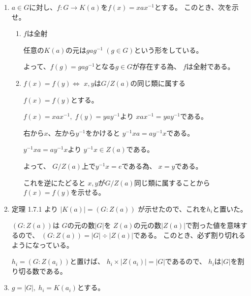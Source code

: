 \documentclass[12pt,b5paper]{ltjsarticle}
\begin{document}
\begin{enumerate}
\begin{enumerate}
      \end{enumerate}
 \item $a\in G$に対し、$f:G\to K(a)$を$f(x)=xax^{-1}$とする。
       このとき、次を示せ。
       \begin{enumerate}
        \item $f$は全射

              \dotfill

              任意の$K(a)$の元は$gag^{-1} \; (g\in G)$という形をしている。

              よって、$f(g)=gag^{-1}$となる$g\in G$が存在する為、
              $f$は全射である。

              \hrulefill

        \item $f(x)=f(y) \Leftrightarrow$ $x,y$は$G/Z(a)$の同じ類に属する
              \label{cll}

              \dotfill


              $f(x)=f(y)$とする。

              $f(x) = xax^{-1}, \; f(y)=yay^{-1}$より
              $xax^{-1}=yay^{-1}$である。

              右から$x$、左から$y^{-1}$をかけると
              $y^{-1}xa = ay^{-1}x$である。

              $y^{-1}xa = ay^{-1}x$より
              $y^{-1}x \in Z(a)$である。

              よって、
              $G/Z(a)$上で$y^{-1}x = e$である為、
              $x=y$である。

              これを逆にたどると
              $x,y$が$G/Z(a)$同じ類に属することから$f(x)=f(y)$を示せる。


              \hrulefill

       \end{enumerate}

 \item
      定理 1.7.1 より $|K(a)| = (G:Z(a))$ が示せたので、これを$h_{i}$と置いた。
      

      $(G:Z(a))$は $G$の元の数$|G|$を
      $Z(a)$の元の数$|Z(a)|$で割った値を意味するので、
      $(G:Z(a)) = |G| \div |Z(a)|$である。
      このとき、必ず割り切れるようになっている。

      $h_{i}=(G:Z(a_{i}))$と置けば、
      $h_{i}\times |Z(a_{i})| = |G|$であるので、
      $h_{i}$は$|G|$を割り切る数である。

      \hrulefill

 \item $g=|G|,\; h_{i}=K(a_{i})$とする。


\end{enumerate}
\end{document}
